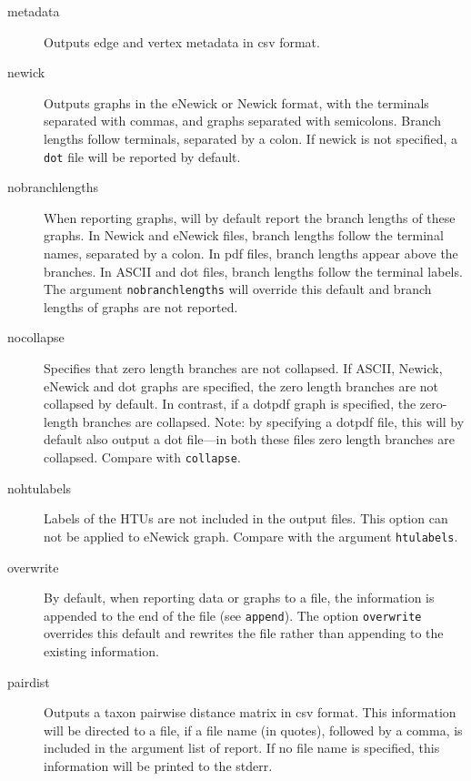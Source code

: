 \begin{description}
\begin{description}
		\end{description}
				
		\item[metadata] Outputs edge and vertex metadata in csv 	format.
		
		\item[newick] Outputs graphs in the eNewick or Newick format, with the terminals
		separated with commas, and graphs separated with semicolons. Branch
		lengths follow terminals, separated by a colon. If newick is not specified, 
		a \texttt{dot} file will be reported by default.
		
		\item[nobranchlengths] When reporting graphs, \phyg will by default 
		report the branch lengths of these graphs. In Newick and eNewick files, 
		branch lengths follow the terminal names, separated by a colon. In pdf 
		files, branch lengths appear above the branches. In ASCII and 
		dot files, branch lengths follow the terminal labels. The argument
		\texttt{nobranchlengths} will override this default and branch lengths 
		of graphs are not reported.
		
		\item[nocollapse] Specifies that zero length branches are not collapsed.
		If ASCII, Newick, eNewick and dot graphs are specified, the zero length 
		branches are not collapsed by default. In contrast, if a dotpdf graph is 
		specified, the zero-length branches are collapsed. Note: by specifying 
		a dotpdf file, this will by default also output a dot file---in both these files 
		zero length branches are collapsed. Compare with \texttt{collapse}. 
				
		\item[nohtulabels] Labels of the HTUs are not included in the output files. 
		This option can not be applied to eNewick graph. Compare with the argument 
		\texttt{htulabels}.
		
		\item[overwrite] By default, when reporting data or graphs to a file, the 
		information is appended to the end of the file (see \texttt{append}). The 
		option \texttt{overwrite} overrides this default and rewrites the file rather 
		than appending to the existing information.

		\item[pairdist] Outputs a taxon pairwise distance matrix in csv format. 
		This information will be directed to a file, if a file name (in quotes), followed 
		by a comma, is included in the argument list of report. If no file name is 
		specified, this information will be printed to the stderr.
		

\end{description}
